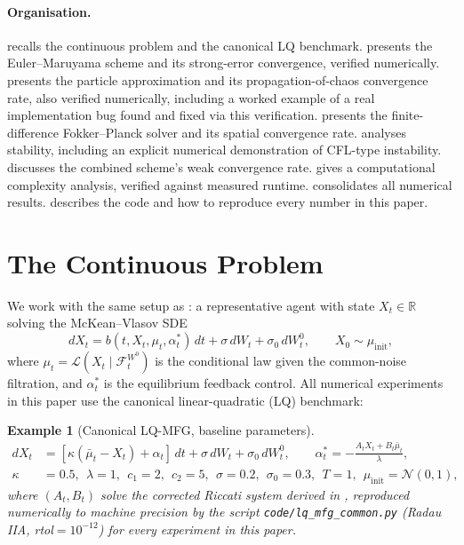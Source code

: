 \documentclass[11pt]{article}
\newtheorem{example}[theorem]{Example}
\theoremstyle{remark}
\begin{document}
\paragraph{Organisation.}  recalls the continuous problem and
the canonical LQ benchmark.  presents the Euler--Maruyama
scheme and its strong-error convergence, verified numerically.
 presents the particle approximation and its
propagation-of-chaos convergence rate, also verified numerically, including a
worked example of a real implementation bug found and fixed via this verification.
 presents the finite-difference Fokker--Planck solver and its
spatial convergence rate.  analyses stability, including an
explicit numerical demonstration of CFL-type instability.
 discusses the combined scheme's weak convergence rate.
 gives a computational complexity analysis, verified against
measured runtime.  consolidates all numerical results.
 describes the code and how to reproduce every number in
this paper.

\section{The Continuous Problem}
\label{sec:continuous}

We work with the same setup as \citet{monyimba2026paper1}: a representative agent
with state $X_t \in \mathbb{R}$ solving the McKean--Vlasov SDE
\begin{equation}
    dX_t = b(t, X_t, \mu_t, \alpha_t^*)\, dt + \sigma\, dW_t + \sigma_0\, dW_t^0,
    \qquad X_0 \sim \mu_{\mathrm{init}},
    \label{eq:mv-sde}
\end{equation}
where $\mu_t = \mathcal{L}(X_t \mid \mathcal{F}_t^{W^0})$ is the conditional law
given the common-noise filtration, and $\alpha_t^*$ is the equilibrium feedback
control. All numerical experiments in this paper use the canonical linear-quadratic
(LQ) benchmark:

\begin{example}[Canonical LQ-MFG, baseline parameters]
\label{ex:lq-mfg}
\begin{align*}
    dX_t &= [\kappa(\bar\mu_t - X_t) + \alpha_t]\, dt + \sigma\, dW_t + \sigma_0\,
        dW_t^0, \qquad \alpha_t^* = -\frac{A_tX_t+B_t\bar\mu_t}{\lambda}, \\
    \kappa&=0.5,\ \ \lambda=1,\ \ c_1=2,\ \ c_2=5,\ \ \sigma=0.2,\ \ \sigma_0=0.3,\
        \ T=1,\ \ \mu_{\mathrm{init}}=\mathcal{N}(0,1),
\end{align*}
where $(A_t,B_t)$ solve the corrected Riccati system derived in
\citet[Appendix A]{monyimba2026thesis}, reproduced numerically to machine precision
by the script \texttt{code/lq\_mfg\_common.py} (Radau IIA, rtol$=10^{-12}$) for
every experiment in this paper.
\end{example}
\end{document}
